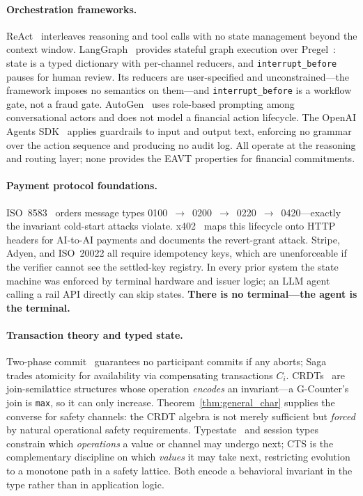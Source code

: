 \documentclass{article}
\begin{document}
\paragraph{Orchestration frameworks.} ReAct~\cite{react} interleaves reasoning and tool calls
with no state management beyond the context window. LangGraph~\cite{langgraph} provides
stateful graph execution over Pregel~\cite{pregel}: state is a typed dictionary with
per-channel reducers, and \texttt{interrupt\_before} pauses for human review. Its reducers are
user-specified and unconstrained---the framework imposes no semantics on them---and
\texttt{interrupt\_before} is a workflow gate, not a fraud gate. AutoGen~\cite{autogen} uses
role-based prompting among conversational actors and does not model a financial action
lifecycle. The OpenAI Agents SDK~\cite{openai_agents} applies guardrails to input and output
text, enforcing no grammar over the action sequence and producing no audit log. All operate at
the reasoning and routing layer; none provides the EAVT properties for financial commitments.

\paragraph{Payment protocol foundations.} ISO~8583~\cite{iso8583} orders message types
0100~$\to$~0200~$\to$~0220~$\to$~0420---exactly the invariant cold-start attacks violate.
x402~\cite{x402} maps this lifecycle onto HTTP headers for AI-to-AI payments and documents the
revert-grant attack. Stripe, Adyen, and ISO~20022 all require idempotency keys, which are
unenforceable if the verifier cannot see the settled-key registry. In every prior system the
state machine was enforced by terminal hardware and issuer logic; an LLM agent calling a rail
API directly can skip states. \textbf{There is no terminal---the agent is the terminal.}

\paragraph{Transaction theory and typed state.} Two-phase commit~\cite{2pc} guarantees no
participant commits if any aborts; Saga~\cite{saga} trades atomicity for availability via
compensating transactions $C_i$. CRDTs~\cite{crdts} are join-semilattice structures whose
operation \emph{encodes} an invariant---a G-Counter's join is \texttt{max}, so it can only
increase. Theorem~\ref{thm:general_char} supplies the converse for safety channels: the CRDT
algebra is not merely sufficient but \emph{forced} by natural operational safety requirements.
Typestate~\cite{typestate} and session types~\cite{sessiontypes} constrain which
\emph{operations} a value or channel may undergo next; CTS is the complementary discipline on
which \emph{values} it may take next, restricting evolution to a monotone path in a safety
lattice. Both encode a behavioral invariant in the type rather than in application logic.
\end{document}
